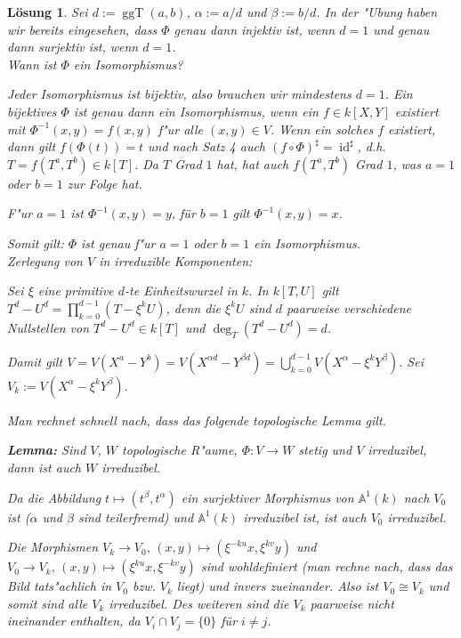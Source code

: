 \documentclass[a4paper, 12pt, numbers=noendperiod, chapterprefix=true, headsepline]{scrbook}
\theoremstyle{break}
\newtheorem{Loes}{L\"osung}
\theoremstyle{nonumberbreak}
\theoremstyle{nonumberplain}
\newcommand{\isom}{\cong}
\DeclareMathOperator{\id}{id}
\DeclareMathOperator{\ggT}{ggT}
\newcommand{\A}{\mathbb{A}}
\begin{document}
\setcounter{Loes}{2}

\begin{Loes}
Sei $d:= \ggT(a,b)$, $\alpha := a/d$ und $\beta := b/d$. In der "Ubung haben wir bereits eingesehen, dass $\Phi$ genau dann injektiv ist, wenn $d=1$ und genau dann surjektiv ist, wenn $d=1$.\\

\emph{Wann ist $\Phi$ ein Isomorphismus?}

Jeder Isomorphismus ist bijektiv, also brauchen wir mindestens $d=1$. Ein bijektives $\Phi$ ist genau dann ein Isomorphismus, wenn ein $f \in k[X,Y]$ existiert mit $\Phi^{-1}(x,y) = f(x,y)$ f"ur alle $(x,y) \in V$. Wenn ein solches $f$ existiert, dann gilt $f (\Phi(t)) = t$ und nach Satz 4 auch $(f \circ \Phi)^\sharp = \id^\sharp$, d.h. $T = f(T^a, T^b) \in k[T]$. Da $T$ Grad $1$ hat, hat auch $f(T^a , T^b)$ Grad $1$, was $a=1 $ oder $b=1$ zur Folge hat.

F"ur $a=1$ ist $\Phi^{-1}(x,y) =y$, für $b=1$ gilt $\Phi^{-1}(x,y) =x$.

Somit gilt: $\Phi$ ist genau f"ur $a=1$ oder $b=1$ ein Isomorphismus.\\

\emph{Zerlegung von $V$ in irreduzible Komponenten:}

Sei $\xi$ eine primitive $d$-te Einheitswurzel in $k$. In $k[T,U]$ gilt $T^d - U^d = \prod_{k=0}^{d-1} (T - \xi^k U)$, denn die $\xi^kU$ sind $d$ paarweise verschiedene Nullstellen von $T^d - U^d \in k[T]$ und $\deg_T(T^d - U^d) = d$.

Damit gilt $V = V(X^a - Y^b) = V(X^{\alpha d} - Y ^{\beta d}) = \bigcup_{k=0}^{d-1} V(X^\alpha - \xi^k Y^\beta)$. Sei $V_k := V(X^\alpha - \xi^k Y^\beta)$.

Man rechnet schnell nach, dass das folgende topologische Lemma gilt.

\textbf{Lemma:} Sind $V$, $W$ topologische R"aume, $\Phi \colon V \to W$ stetig und $V$ irreduzibel, dann ist auch $W$ irreduzibel.
 
Da die Abbildung $t \mapsto (t^\beta, t^\alpha)$ ein surjektiver Morphismus von $\A^1(k)$ nach $V_0$ ist ($\alpha$ und $\beta$ sind teilerfremd) und $\A^1(k)$ irreduzibel ist, ist auch $V_0$ irreduzibel.

Die Morphismen $V_k \to V_0, \, (x,y) \mapsto (\xi^{-ku} x, \xi^{kv} y)$ und $V_0 \to V_k, \, (x,y) \mapsto (\xi^{ku} x, \xi^{-kv} y)$ sind wohldefiniert (man rechne nach, dass das Bild tats"achlich in $V_0$ bzw. $V_k$ liegt) und invers zueinander. Also ist $V_0 \isom V_k$ und somit sind alle $V_k$ irreduzibel. Des weiteren sind die $V_k$ paarweise nicht ineinander enthalten, da $V_i \cap V_j = \{0\}$ für $i \neq j$.


\end{Loes}
\end{document}
